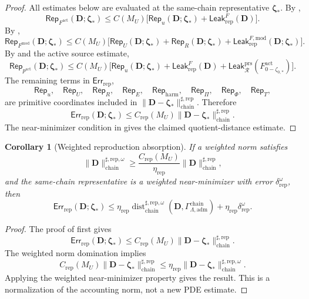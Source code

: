 \documentclass[11pt]{article}
\numberwithin{equation}{section}
\newtheorem{corollary}[corollary]{Corollary}
\theoremstyle{definition}
\theoremstyle{remark}
\newcommand{\adm}{\mathrm{adm}}
\newcommand{\prs}{\mathrm{prs}}
\newcommand{\harm}{\mathrm{harm}}
\newcommand{\rep}{\mathrm{rep}}
\newcommand{\chain}{\mathrm{chain}}
\newcommand{\Err}{\mathsf{Err}}
\newcommand{\Leak}{\mathsf{Leak}}
\newcommand{\Rep}{\mathsf{Rep}}
\newcommand{\Dist}{\operatorname{dist}}
\newcommand{\calR}{\mathcal R}
\newcommand{\bD}{\mathbf D}
\newcommand{\bzeta}{\boldsymbol\zeta}
\newcommand{\Gchain}{\Gamma_{\Lambda,\adm}^{\chain}}
\begin{document}
\begin{proof}
All estimates below are evaluated at the same-chain representative
\(\bzeta_*\).  By ,
\[
    \Rep_{F^{\mathrm{act}}}(\bD;\bzeta_*)
    \le
    C(M_U)
    \bigl[
        \Rep_u(\bD;\bzeta_*)
        +
        \Leak_{\rep}^{F}(\bD)
    \bigr].
\]
By ,
\[
    \Rep_{F^{\mathrm{mod}}}(\bD;\bzeta_*)
    \le
    C(M_U)
    \bigl[
        \Rep_U(\bD;\bzeta_*)
        +
        \Rep_R(\bD;\bzeta_*)
        +
        \Leak_{\rep}^{F,\mathrm{mod}}(\bD;\bzeta_*)
    \bigr].
\]
By  and the active source estimate,
\[
    \Rep_{p^{\mathrm{act}}}(\bD;\bzeta_*)
    \le
    C(M_U)
    \bigl[
        \Rep_u(\bD;\bzeta_*)
        +
        \Leak_{\rep}^{F}(\bD)
        +
        \Leak_{\calR}^{\prs}(F^{\mathrm{act}}_{0-\zeta_{0,*}})
    \bigr].
\]
The remaining terms in \(\Err_{\rep}\),
\[
    \Rep_u,\quad
    \Rep_U,\quad
    \Rep_R,\quad
    \Rep_E,\quad
    \Rep_{\harm},\quad
    \Rep_{\Pi},\quad
    \Rep_{\Phi},\quad
    \Rep_T,
\]
are primitive coordinates included in
\(\|\bD-\bzeta_*\|_{\chain}^{\sharp,\rep}\).  Therefore
\[
    \Err_{\rep}(\bD;\bzeta_*)
    \le
    C_{\rep}(M_U)
    \|\bD-\bzeta_*\|_{\chain}^{\sharp,\rep}.
\]
The near-minimizer condition in  gives the
claimed quotient-distance estimate.
\end{proof}

\begin{corollary}[Weighted reproduction absorption]
\label{rep:cor:weighted-reproduction-absorption}
If a weighted norm satisfies
\[
    \|\bD\|_{\chain}^{\sharp,\rep,\omega}
    \ge
    \frac{C_{\rep}(M_U)}{\eta_{\rep}}
    \|\bD\|_{\chain}^{\sharp,\rep},
\]
and the same-chain representative is a weighted near-minimizer with error
\(\delta_{\rep}^{\omega}\), then
\[
    \Err_{\rep}(\bD;\bzeta_*)
    \le
    \eta_{\rep}
    \Dist_{\chain}^{\sharp,\rep,\omega}(\bD,\Gchain)
    +
    \eta_{\rep}\delta_{\rep}^{\omega}.
\]
\end{corollary}

\begin{proof}
The proof of  first gives
\[
    \Err_{\rep}(\bD;\bzeta_*)
    \le
    C_{\rep}(M_U)\|\bD-\bzeta_*\|_{\chain}^{\sharp,\rep}.
\]
The weighted norm domination implies
\[
    C_{\rep}(M_U)\|\bD-\bzeta_*\|_{\chain}^{\sharp,\rep}
    \le
    \eta_{\rep}\|\bD-\bzeta_*\|_{\chain}^{\sharp,\rep,\omega}.
\]
Applying the weighted near-minimizer property gives the result.  This is a
normalization of the accounting norm, not a new PDE estimate.
\end{proof}
\end{document}
